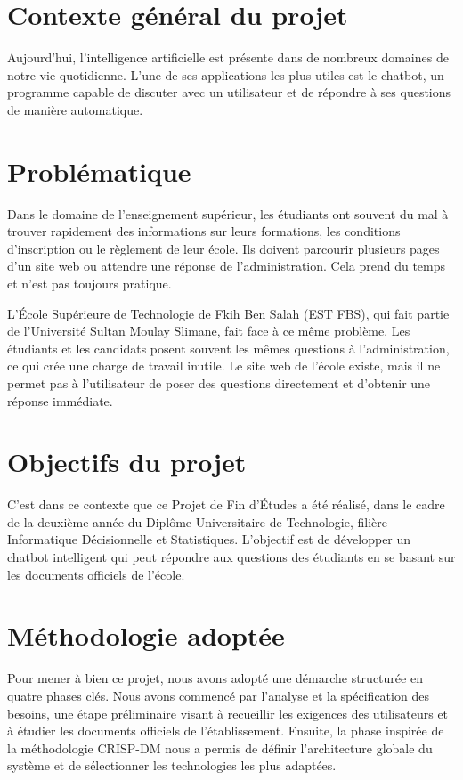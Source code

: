 \documentclass[12pt, a4paper, twoside]{report}
\begin{document}
\section{Contexte général du projet}
Aujourd'hui, l'intelligence artificielle est présente dans de nombreux domaines de notre vie quotidienne. L'une de ses applications les plus utiles est le chatbot, un programme capable de discuter avec un utilisateur et de répondre à ses questions de manière 
\newline
automatique.

\section{Problématique}
Dans le domaine de l'enseignement supérieur, les étudiants ont souvent du mal à trouver rapidement des informations sur leurs formations, les conditions d'inscription ou le règlement de leur école. Ils doivent parcourir plusieurs pages d'un site web ou attendre une réponse de l'administration. Cela prend du temps et n'est pas toujours pratique.

L'École Supérieure de Technologie de Fkih Ben Salah (EST FBS), qui fait partie de l'Université Sultan Moulay Slimane, fait face à ce même problème. Les étudiants et les candidats posent souvent les mêmes questions à l'administration, ce qui crée une charge de travail inutile. Le site web de l'école existe, mais il ne permet pas à l'utilisateur de poser des questions directement et d'obtenir une réponse immédiate.


\section{Objectifs du projet}
C'est dans ce contexte que ce Projet de Fin d'Études a été réalisé, dans le cadre de la deuxième année du Diplôme Universitaire de Technologie, filière \newline Informatique Décisionnelle et Statistiques. L'objectif est de développer un chatbot \newline intelligent qui peut répondre aux questions des étudiants en se basant sur les documents officiels de l'école.
\newpage
%
\section{Méthodologie adoptée}

Pour mener à bien ce projet, nous avons adopté une démarche structurée en quatre phases clés. Nous avons commencé par l'analyse et la spécification des besoins, une étape préliminaire visant à recueillir les exigences des utilisateurs et à étudier les documents officiels de l'établissement. Ensuite, la phase inspirée de la méthodologie CRISP-DM nous a permis de définir l'architecture globale du système et de sélectionner les technologies les plus adaptées.
\end{document}

